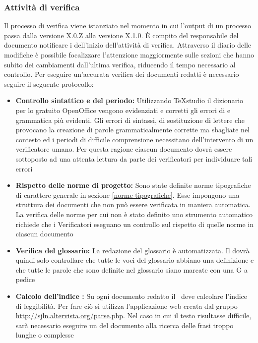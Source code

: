 \documentclass[12pt,a4paper]{article}
\begin{document}
\subsubsection{Attività di verifica}

Il processo di verifica viene istanziato nel momento in cui l'output di un processo passa dalla versione X.0.Z alla versione X.1.0. È compito del responsabile del documento notificare i \VRpl{} dell'inizio dell'attività di verifica. Attraverso il diario delle modifiche è possibile focalizzare l'attenzione maggiormente sulle sezioni che hanno subito dei cambiamenti dall'ultima verifica, riducendo il tempo necessario al controllo. Per eseguire un'accurata verifica dei documenti redatti è necessario seguire il seguente protocollo:

\begin{itemize}
	\item \textbf{Controllo sintattico e del periodo:} Utilizzando TeXstudio il dizionario per lo  gratuito OpenOffice vengono evidenziati e corretti gli errori di  e grammatica più evidenti. Gli errori di sintassi, di sostituzione di lettere che provocano la creazione di parole grammaticalmente corrette ma sbagliate nel contesto ed i periodi di difficile comprensione necessitano dell'intervento di un verificatore umano. Per questa ragione ciascun documento dovrà essere sottoposto ad una attenta lettura da parte dei verificatori per individuare tali errori
	\item \textbf{Rispetto delle norme di progetto:} Sono state definite norme tipografiche di carattere generale in \NdP{} sezione \ref{norme tipografiche}. Esse impongono una struttura dei documenti che non può essere verificata in maniera automatica. La verifica delle norme per cui non è stato definito uno strumento automatico richiede che i Verificatori eseguano un controllo sul rispetto di quelle norme in ciascun documento
	\item \textbf{Verifica del glossario:} La redazione del glossario è automatizzata. Il \VR{} dovrà quindi solo controllare che tutte le voci del glossario abbiano una definizione e che tutte le parole che sono definite nel glossario siano marcate con una G a pedice
	\item \textbf{Calcolo dell’indice :} Su ogni documento redatto il \VR\ deve calcolare l’indice di leggibilità. Per fare ciò si utilizza l'applicazione web creata dal gruppo \url{http://sjln.altervista.org/parse.php}. Nel caso in cui il testo risultasse difficile, sarà necessario eseguire un  del documento alla ricerca delle frasi troppo lunghe o complesse

\end{itemize}
\end{document}

